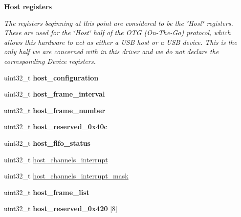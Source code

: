 \begin{Indent}{\bf Host registers}\par
{\em The registers beginning at this point are considered to be the \char`\"{}\-Host\char`\"{} registers. These are used for the \char`\"{}\-Host\char`\"{} half of the O\-T\-G (On-\/\-The-\/\-Go) protocol, which allows this hardware to act as either a U\-S\-B host or a U\-S\-B device. This is the only half we are concerned with in this driver and we do not declare the corresponding Device registers. }\begin{DoxyCompactItemize}
\item 
\hypertarget{structdwc__regs_a6b945c6cfb266c902669bebf68c7ed7f}{uint32\-\_\-t {\bfseries host\-\_\-configuration}}\label{structdwc__regs_a6b945c6cfb266c902669bebf68c7ed7f}

\item 
\hypertarget{structdwc__regs_a4de96d697c358d100332283fcd25a7a3}{uint32\-\_\-t {\bfseries host\-\_\-frame\-\_\-interval}}\label{structdwc__regs_a4de96d697c358d100332283fcd25a7a3}

\item 
\hypertarget{structdwc__regs_a2235ec5e40147eefb96945db117b7c2d}{uint32\-\_\-t {\bfseries host\-\_\-frame\-\_\-number}}\label{structdwc__regs_a2235ec5e40147eefb96945db117b7c2d}

\item 
\hypertarget{structdwc__regs_a68f1b9be88411e2cb3ea68e60b19ca1d}{uint32\-\_\-t {\bfseries host\-\_\-reserved\-\_\-0x40c}}\label{structdwc__regs_a68f1b9be88411e2cb3ea68e60b19ca1d}

\item 
\hypertarget{structdwc__regs_a40b8e5b66ce41ffa700397e64de38e44}{uint32\-\_\-t {\bfseries host\-\_\-fifo\-\_\-status}}\label{structdwc__regs_a40b8e5b66ce41ffa700397e64de38e44}

\item 
uint32\-\_\-t \hyperlink{structdwc__regs_a644ea85e1c69c703b0bf23796476a769}{host\-\_\-channels\-\_\-interrupt}
\item 
uint32\-\_\-t \hyperlink{structdwc__regs_a8b91feb4d7032ac1a1ebf3da2fd9b260}{host\-\_\-channels\-\_\-interrupt\-\_\-mask}
\item 
\hypertarget{structdwc__regs_a47d7d1b3fbbde9af3422a64bd6a17ff6}{uint32\-\_\-t {\bfseries host\-\_\-frame\-\_\-list}}\label{structdwc__regs_a47d7d1b3fbbde9af3422a64bd6a17ff6}

\item 
\hypertarget{structdwc__regs_ac9aca639220e0cc22922b23d8d6fb21e}{uint32\-\_\-t {\bfseries host\-\_\-reserved\-\_\-0x420} \mbox{[}8\mbox{]}}\label{structdwc__regs_ac9aca639220e0cc22922b23d8d6fb21e}


\end{DoxyCompactItemize}
\end{Indent}
